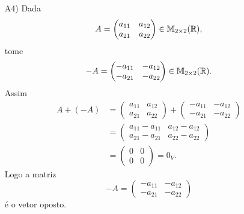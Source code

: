 \documentclass[12pt]{exam}
\begin{document}
\begin{itemize}
        \item[A4)] Dada
        \[
        A = \begin{pmatrix} a_{11} & a_{12}\\a_{21} & a_{22}\end{pmatrix} \in \mathbb{M}_{2 \times 2}(\mathbb{R}),
        \]
        tome
        \[
        -A = \begin{pmatrix} -a_{11} & -a_{12}\\-a_{21} & -a_{22}\end{pmatrix} \in \mathbb{M}_{2 \times 2}(\mathbb{R}).
        \]
        Assim
        \begin{align*}
            A + (-A) & = \begin{pmatrix} a_{11} & a_{12}\\a_{21} & a_{22}\end{pmatrix} +
            \begin{pmatrix} -a_{11} & -a_{12}\\-a_{21} & -a_{22}\end{pmatrix}
            \\ &= \begin{pmatrix} a_{11} - a_{11} & a_{12} - a_{12}\\a_{21} - a_{21} & a_{22} - a_{22}\end{pmatrix}
            \\ &= \begin{pmatrix}0 & 0\\0 & 0\end{pmatrix} = 0_V.
        \end{align*}
        Logo a matriz
        \[
        -A = \begin{pmatrix} -a_{11} & -a_{12}\\-a_{21} & -a_{22}\end{pmatrix}
        \]
        é o vetor oposto.


\end{itemize}
\end{document}
